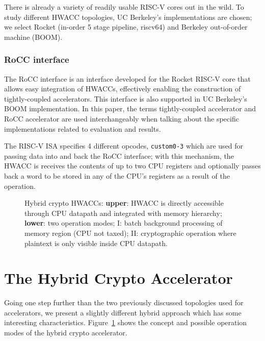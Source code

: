 \documentclass[10pt,conference]{IEEEtran}
\begin{document}
There is already a variety of readily usable RISC-V cores out in the wild. To
study different HWACC topologies, UC Berkeley's implementations are chosen; we
select Rocket (in-order 5 stage pipeline, riscv64) and Berkeley out-of-order
machine (BOOM).

\subsubsection{RoCC interface}

The RoCC interface is an interface developed for the Rocket RISC-V core that
allows easy integration of HWACCs, effectively enabling the construction of
tightly-coupled accelerators. This interface is also supported in UC Berkeley's
BOOM implementation. In this paper, the terms tightly-coupled accelerator and
RoCC accelerator are used interchangeably when talking about the specific
implementations related to evaluation and results.

The RISC-V ISA specifies 4 different opcodes, \texttt{custom0-3} which are used for passing data
into and back the RoCC interface; with this mechanism, the HWACC is receives the
contents of up to two CPU registers and optionally passes back a word to be stored in any of
the CPU's registers as a result of the operation.

\begin{figure}
  \centering
  \caption{Hybrid crypto HWACCs: \textbf{upper}: HWACC is directly accessible through CPU datapath and
    integrated with memory hierarchy; \textbf{lower}: two operation modes; I: batch
    background processing of memory region (CPU not taxed); II: cryptographic
    operation where plaintext is only visible inside CPU datapath.}
  \label{fig:hybrid}
\end{figure}

\section{The Hybrid Crypto Accelerator}

Going one step further than the two previously discussed topologies used for
accelerators, we present a slightly different hybrid approach which has
some interesting characteristics. Figure~\ref{fig:hybrid} shows the concept and
possible operation modes of the hybrid crypto accelerator.
\end{document}

